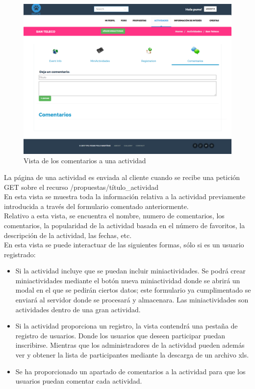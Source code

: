 \begin{figure}[H]
\centering
\includegraphics[width=12cm]{img/actividad_comment}
\caption{Vista de los comentarios a una actividad}
\label{figura:actividad_comment}
\end{figure}
La página de una actividad es enviada al cliente cuando se recibe una petición GET sobre el recurso /propuestas/{título\_actividad}\\
En esta vista se muestra toda la información relativa a la actividad previamente introducida a través del formulario comentado anteriormente.\\
Relativo a esta vista, se encuentra el nombre, numero de comentarios, los comentarios, la popularidad de la actividad basada en el número de favoritos, la descripción de la actividad, las fechas, etc.\\
En esta vista se puede interactuar de las siguientes formas, sólo si es un usuario registrado:
\begin{itemize}
\item Si la actividad incluye que se puedan incluir miniactividades. Se podrá crear miniactividades mediante el botón nueva miniactividad donde se abrirá un modal en el que se pedirán ciertos datos; este formulario ya cumplimentado se enviará al servidor donde se procesará y almacenara. Las miniactividades son actividades dentro de una gran actividad.  
\item Si la actividad proporciona un registro, la vista contendrá una pestaña de registro de usuarios. Donde los usuarios que deseen participar puedan inscribirse. Mientras que los administradores de la actividad pueden además ver y obtener la lista de participantes mediante la descarga de un archivo xls.
\item Se ha proporcionado un apartado de comentarios a la actividad para que los usuarios puedan comentar cada actividad.
\end{itemize}


